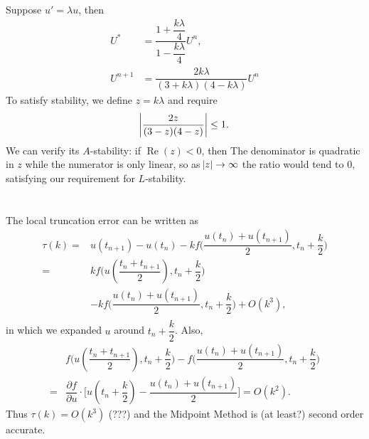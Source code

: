 \documentclass[11pt]{article}
\begin{document}
\subsection{}
Suppose $u'=\lambda u$, then 
\begin{equation}\begin{split}
    U^* &= \dfrac{1+\dfrac{k\lambda}4}{1-\dfrac{k\lambda}4}U^n,\\
    U^{n+1} &= \dfrac{2k\lambda}{(3+k\lambda)(4-k\lambda)}U^n
\end{split}\end{equation} 
To satisfy stability, we define $z=k\lambda$ and require
\begin{equation}
    \abs{\dfrac{2z}{(3-z)(4-z)}}\leq 1.
\end{equation} 
We can verify its $A$-stability: if $\operatorname{Re}(z)<0$, then 
The denominator is quadratic in $z$ while the numerator is only linear, 
so as $\abs{z}\to\infty$ the ratio would tend to 0, satisfying our requirement 
for $L$-stability.

\pagebreak
\section{}
\subsection{}
The local truncation error can be written as
\begin{equation}\begin{split}
    \tau(k) =& u(t_{n+1})-u(t_n)-kf\Big(\dfrac{u(t_n)+u(t_{n+1})}2,t_n+\dfrac k2\Big)\\
            =& kf\Big(u(\dfrac{t_n+t_{n+1}}2),t_n+\dfrac k2\Big)\\
             & -kf\Big(\dfrac{u(t_n)+u(t_{n+1})}2,t_n+\dfrac k2\Big)+O(k^3),\\
\end{split}\end{equation}
in which we expanded $u$ around $t_n+\dfrac k2$. Also,
\begin{equation}\begin{split}
    &f\Big(u(\dfrac{t_n+t_{n+1}}2),t_n+\dfrac k2\Big) - 
        f\Big(\dfrac{u(t_n)+u(t_{n+1})}2,t_n+\dfrac k2\Big) \\
    =&\dfrac{\partial f}{\partial u}\cdot\Big[u(t_n+\dfrac k2) -
        \dfrac{u(t_n)+u(t_{n+1})}2\Big] = O(k^2).
\end{split}\end{equation}
Thus $\tau(k)=O(k^3)$ (???) and the Midpoint Method is (at least?) second order accurate.
\end{document}
